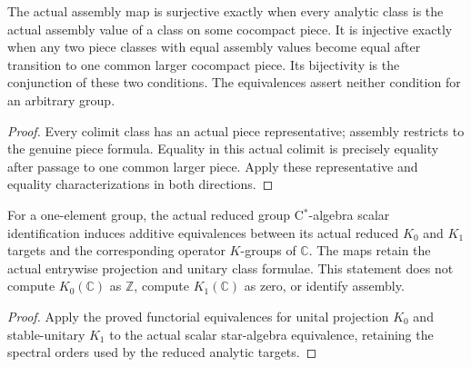 \begin{proposition}\label{prop:assembly-piece-bijectivity-criteria}
\leanok
The actual assembly map is surjective exactly when every analytic class is
the actual assembly value of a class on some cocompact piece. It is injective
exactly when any two piece classes with equal assembly values become equal
after transition to one common larger cocompact piece. Its bijectivity is the
conjunction of these two conditions. The equivalences assert neither
condition for an arbitrary group.
\end{proposition}
\begin{proof}
\leanok
Every colimit class has an actual piece representative; assembly restricts
to the genuine piece formula. Equality in this actual colimit is precisely
equality after passage to one common larger piece. Apply these representative
and equality characterizations in both directions.
\end{proof}

\begin{proposition}\label{prop:trivial-group-analytic-calibration}
\leanok
For a one-element group, the actual reduced group C$^*$-algebra scalar
identification induces additive equivalences between its actual reduced
$K_0$ and $K_1$ targets and the corresponding operator $K$-groups of
$\mathbb C$. The maps retain the actual entrywise projection and unitary
class formulae. This statement does not compute $K_0(\mathbb C)$ as
$\mathbb Z$, compute $K_1(\mathbb C)$ as zero, or identify assembly.
\end{proposition}
\begin{proof}
\leanok
Apply the proved functorial equivalences for unital projection $K_0$ and
stable-unitary $K_1$ to the actual scalar star-algebra equivalence, retaining
the spectral orders used by the reduced analytic targets.
\end{proof}

